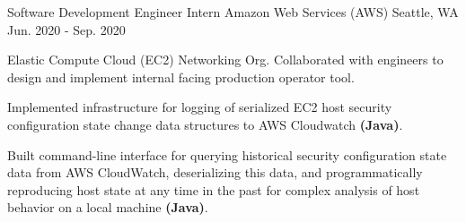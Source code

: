 \cventry
    {Software Development Engineer Intern} %
    {Amazon Web Services (AWS)} %
    {Seattle, WA} %
    {Jun. 2020 - Sep. 2020} %
    {
      \begin{cvitems} %
        \item {Elastic Compute Cloud (EC2) Networking Org. Collaborated with 
        engineers to design and implement internal facing production operator tool.}
        \item {Implemented infrastructure for logging of serialized
        EC2 host security configuration state change data structures to 
        AWS Cloudwatch \textbf{(Java)}.}
        \item {Built command-line interface for querying historical 
        security configuration state data from AWS CloudWatch, 
        deserializing this data, and 
        programmatically reproducing host state at any time in 
        the past for complex analysis 
        of host behavior on a local machine \textbf{(Java)}.}
      \end{cvitems}
    } 